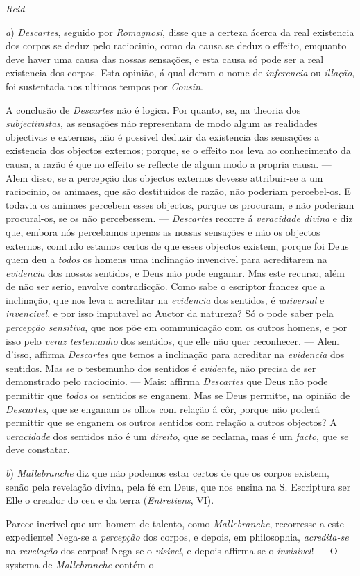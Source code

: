 \emph{Reid}.\par *\par \emph{a}) \emph{Descartes}, seguido por \emph{Romagnosi}, disse que a certeza ácerca da real existencia dos corpos se deduz pelo raciocinio, como da causa se deduz o effeito, emquanto deve haver uma causa das nossas sensações, e esta causa só pode ser a real existencia dos corpos. Esta opinião, á qual deram o nome de \emph{inferencia} ou \emph{illação}, foi sustentada nos ultimos tempos por \emph{Cousin}.\par A conclusão de \emph{Descartes} não é logica. Por quanto, se, na theoria dos \emph{subjectivistas}, as sensações não representam de modo algum as realidades objectivas e externas, não é possivel deduzir da existencia das sensações a existencia dos objectos externos; porque, se o effeito nos leva ao conhecimento da causa, a razão é que no effeito se reflecte de algum modo a propria causa. --- Alem disso, se a percepção dos objectos externos devesse attribuir-se a um raciocinio, os animaes, que são destituidos de razão, não poderiam percebel-os. E todavia os animaes percebem esses objectos, porque os procuram, e não poderiam procural-os, se os não percebessem. --- \emph{Descartes} recorre á \emph{veracidade divina} e diz que, embora nós percebamos apenas as nossas sensações e não os objectos externos, comtudo estamos certos de que esses objectos existem, porque foi Deus quem deu a \emph{todos} os homens uma inclinação invencivel para acreditarem na \emph{evidencia} dos nossos sentidos, e Deus não pode enganar. Mas este recurso, além de não ser serio, envolve contradicção. Como sabe o escriptor francez que a inclinação, que nos leva a acreditar na \emph{evidencia} dos sentidos, é \emph{universal} e \emph{invencivel}, e por isso imputavel ao Auctor da natureza? Só o pode saber pela \emph{percepção sensitiva}, que nos põe em communicação com os outros homens, e por isso pelo \emph{veraz testemunho} dos sentidos, que elle não quer reconhecer. --- Alem d'isso, affirma \emph{Descartes} que temos a inclinação para acreditar na \emph{evidencia} dos sentidos. Mas se o testemunho dos sentidos é \emph{evidente}, não precisa de ser demonstrado pelo raciocinio. --- Mais: affirma \emph{Descartes} que Deus não pode permittir que \emph{todos} os sentidos se enganem. Mas se Deus permitte, na opinião de \emph{Descartes}, que se enganam os olhos com relação á côr, porque não poderá permittir que se enganem os outros sentidos com relação a outros objectos? A \emph{veracidade} dos sentidos não é um \emph{direito}, que se reclama, mas é um \emph{facto}, que se deve constatar.\par \emph{b}) \emph{Mallebranche} diz que não podemos estar certos de que os corpos existem, senão pela revelação divina, pela fé em Deus, que nos ensina na S. Escriptura ser Elle o creador do ceu e da terra (\emph{Entretiens}, VI).\par Parece incrivel que um homem de talento, como \emph{Mallebranche}, recorresse a este expediente! Nega-se a \emph{percepção} dos corpos, e depois, em philosophia, \emph{acredita-se} na \emph{revelação} dos corpos! Nega-se o \emph{visivel}, e depois affirma-se o \emph{invisivel}! --- O systema de \emph{Mallebranche} contém o 